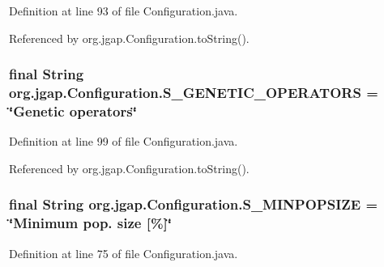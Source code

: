 Definition at line 93 of file Configuration.\-java.



Referenced by org.\-jgap.\-Configuration.\-to\-String().

\hypertarget{classorg_1_1jgap_1_1_configuration_ab6775b7e58ce67558ab8c150d89461a1}{
\subsubsection[{S\-\_\-\-G\-E\-N\-E\-T\-I\-C\-\_\-\-O\-P\-E\-R\-A\-T\-O\-R\-S}]{\setlength{\rightskip}{0pt plus 5cm}final String org.\-jgap.\-Configuration.\-S\-\_\-\-G\-E\-N\-E\-T\-I\-C\-\_\-\-O\-P\-E\-R\-A\-T\-O\-R\-S = \char`\"{}Genetic operators\char`\"{}\hspace{0.3cm}{\ttfamily [static]}}}\label{classorg_1_1jgap_1_1_configuration_ab6775b7e58ce67558ab8c150d89461a1}


Definition at line 99 of file Configuration.\-java.



Referenced by org.\-jgap.\-Configuration.\-to\-String().

\hypertarget{classorg_1_1jgap_1_1_configuration_ae339d3a453ba82ed8b85e8493e16a8ad}{
\subsubsection[{S\-\_\-\-M\-I\-N\-P\-O\-P\-S\-I\-Z\-E}]{\setlength{\rightskip}{0pt plus 5cm}final String org.\-jgap.\-Configuration.\-S\-\_\-\-M\-I\-N\-P\-O\-P\-S\-I\-Z\-E = \char`\"{}Minimum pop. size \mbox{[}\%\mbox{]}\char`\"{}\hspace{0.3cm}{\ttfamily [static]}}}\label{classorg_1_1jgap_1_1_configuration_ae339d3a453ba82ed8b85e8493e16a8ad}


Definition at line 75 of file Configuration.\-java.



